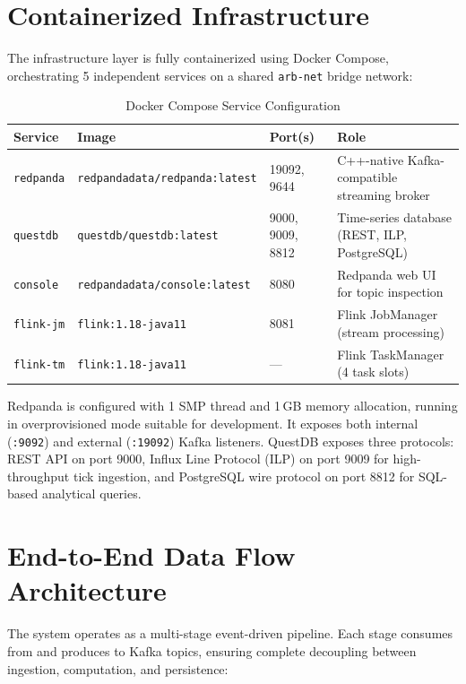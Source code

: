 \documentclass[letterpaper,11pt]{report}
\begin{document}
\section{Containerized Infrastructure}

The infrastructure layer is fully containerized using Docker Compose, orchestrating 5 independent services on a shared \texttt{arb-net} bridge network:

\begin{table}[h]
\centering
\caption{Docker Compose Service Configuration}
\begin{tabular}{lllp{5.5cm}}
\toprule
\textbf{Service} & \textbf{Image} & \textbf{Port(s)} & \textbf{Role} \\
\midrule
\texttt{redpanda} & \texttt{redpandadata/redpanda:latest} & 19092, 9644 & C++-native Kafka-compatible streaming broker \\
\texttt{questdb} & \texttt{questdb/questdb:latest} & 9000, 9009, 8812 & Time-series database (REST, ILP, PostgreSQL) \\
\texttt{console} & \texttt{redpandadata/console:latest} & 8080 & Redpanda web UI for topic inspection \\
\texttt{flink-jm} & \texttt{flink:1.18-java11} & 8081 & Flink JobManager (stream processing) \\
\texttt{flink-tm} & \texttt{flink:1.18-java11} & --- & Flink TaskManager (4 task slots) \\
\bottomrule
\end{tabular}
\end{table}

Redpanda is configured with 1 SMP thread and 1\,GB memory allocation, running in overprovisioned mode suitable for development. It exposes both internal (\texttt{:9092}) and external (\texttt{:19092}) Kafka listeners. QuestDB exposes three protocols: REST API on port 9000, Influx Line Protocol (ILP) on port 9009 for high-throughput tick ingestion, and PostgreSQL wire protocol on port 8812 for SQL-based analytical queries.

\section{End-to-End Data Flow Architecture}

The system operates as a multi-stage event-driven pipeline. Each stage consumes from and produces to Kafka topics, ensuring complete decoupling between ingestion, computation, and persistence:
\end{document}
